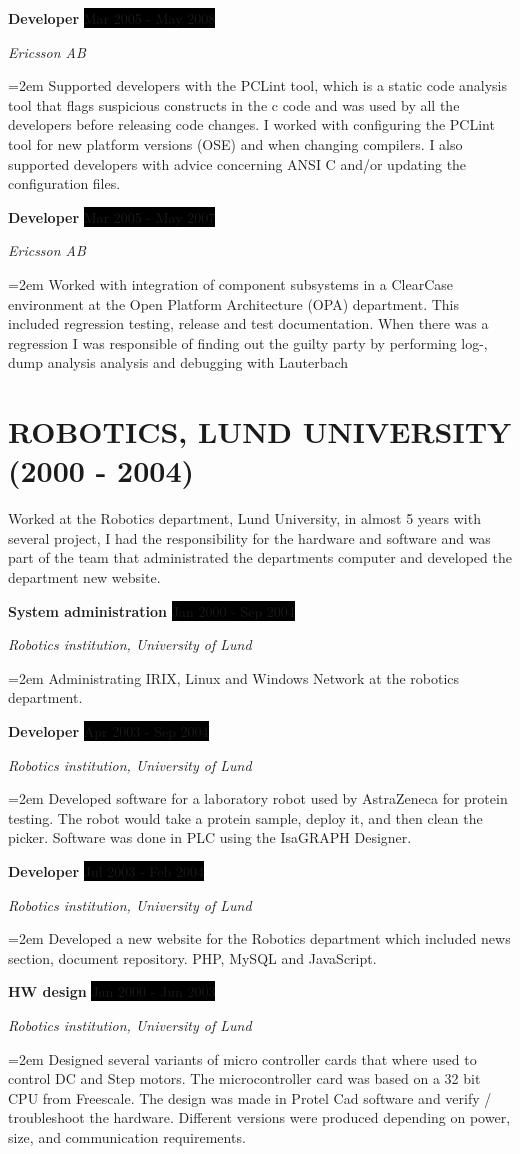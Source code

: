 \documentclass[paper=a4,fontsize=11pt]{scrartcl}
\newcommand{\sepspace}{\vspace*{1em}}
\newcommand{\NewPart}[1]{\section*{\uppercase{#1}}}
\newcommand{\EducationEntry}[4]{
		\noindent \textbf{#1} \hfill 					%
		\colorbox{Black}{%
			\parbox{6em}{%
			\hfill\color{White}#2}} \par				%
		\noindent \textit{#3} \par					%
		\noindent\hangindent=2em\hangafter=0 \small #4 	%
		\normalsize \par}
\newcommand{\WorkEntry}[4]{						%
		\noindent \textbf{#1} \hfill 					%
		\colorbox{Black}{\color{White}#2} \par		%
		\noindent \textit{#3} \par					%
		\noindent\hangindent=2em\hangafter=0 \small #4 	%
		\normalsize \par}
\begin{document}
\WorkEntry{Developer}{Mar 2005 - May 2008}{Ericsson AB}	
  {Supported developers with the PCLint tool, which is a static code analysis tool that flags suspicious 
    constructs in the c code and was used by all the developers before releasing code changes. 
  I worked with configuring the PCLint tool for new platform versions (OSE) and when changing 
  compilers. I also supported developers with advice concerning ANSI C and/or updating the 
  configuration files. 
  }
\sepspace

\WorkEntry{Developer}{Mar 2005 - May 2007}{Ericsson AB}		
  {Worked with integration of component subsystems in a ClearCase environment at the Open Platform 
  Architecture (OPA) department. This included regression testing, release and test documentation. 
  When there was a regression I was responsible of finding out the guilty party by performing log-, 
  dump analysis analysis and debugging with Lauterbach}
\sepspace

\NewPart{Robotics, Lund University (2000 - 2004)}{Worked at the Robotics department, Lund University,
  in almost 5 years with several project, I had the responsibility for the hardware and software 
  and was part of the team that administrated the departments computer and developed the department new website.}
\sepspace

\WorkEntry{System administration}{Jan 2000 - Sep 2004}{Robotics institution, University of Lund}		
  {Administrating IRIX, Linux and Windows Network at the robotics department.}
\sepspace

\WorkEntry{Developer}{Apr 2003 - Sep 2004}{Robotics institution, University of Lund}		
  {Developed software for a laboratory robot used by AstraZeneca for protein testing. 
  The robot would take a protein sample, deploy it, and then clean the picker. 
  Software was done in PLC using the IsaGRAPH Designer.}
\sepspace

\WorkEntry{Developer}{Jul 2003 - Feb 2004}{Robotics institution, University of Lund}		
  {Developed a new website for the Robotics department which included news section, document repository. 
  PHP, MySQL and JavaScript.} 
\sepspace

\WorkEntry{HW design}{Jan 2000 - Jun 2003}{Robotics institution, University of Lund}		
{Designed several variants of micro controller cards that where used to control DC and Step motors. The microcontroller card was based on a 32 bit CPU from 
  Freescale. The design was made in Protel Cad software and verify / troubleshoot the hardware. Different versions were produced depending on power, size, and communication requirements.
}
\sepspace
\end{document}
